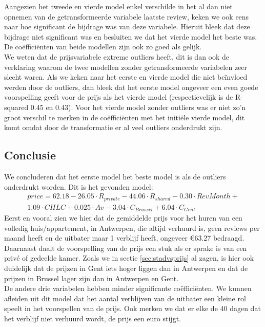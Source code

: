 \documentclass[a4paper,kulak]{kulakarticle} %
\begin{document}
Aangezien het tweede en vierde model enkel verschilde in het al dan niet opnemen van de getransformeerde variabele laatste review, keken we ook eens naar hoe significant de bijdrage was van deze variabele. Hieruit bleek dat deze bijdrage niet significant was en besluiten we dat het vierde model het beste was. De co\"effici\"enten van beide modellen zijn ook zo goed als gelijk.\\

We weten dat de prijsvariabele extreme outliers heeft, dit is dan ook de verklaring waarom de twee modellen zonder getransformeerde variabelen zeer slecht waren. Als we keken naar het eerste en vierde model die niet be\"invloed werden door de outliers, dan bleek dat het eerste model ongeveer een even goede voorspelling geeft voor de prijs als het vierde model (respectievelijk is de R-squared 0.45 en 0.43). Voor het vierde model zonder outliers was er niet zo'n groot verschil te merken in de co\"effici\"enten met het initi\"ele vierde model, dit komt omdat door de transformatie er al veel outliers onderdrukt zijn.\\
\subsection{Conclusie}
We concluderen dat het eerste model het beste model is als de outliers onderdrukt worden. Dit is het gevonden model:
\begin{multline}
price = 62.18 - 26.05\cdot R_{private}  - 44.06\cdot R_{shared}  - 0.30\cdot RevMonth + \\1.09\cdot CHLC + 0.025 \cdot Av - 3.04\cdot C_{Brussel} + 6.04\cdot C_{Gent}
\end{multline}
Eerst en vooral zien we hier dat de gemiddelde prijs voor het huren van een volledig huis/appartement, in Antwerpen, die altijd verhuurd is, geen reviews per maand heeft en de uitbater maar 1 verblijf heeft, ongeveer \euro  63.27 bedraagd. Daarnaast daalt de voorspelling van de prijs een stuk als er sprake is van een priv\'e of gedeelde kamer. Zoals we in sectie \ref{sec:stadvsprijs} al zagen, is hier ook duidelijk dat de prijzen in Gent iets hoger liggen dan in Antwerpen en dat de prijzen in Brussel lager zijn dan in Antwerpen en Gent.\\

De andere drie variabelen hebben minder significante co\"effici\"enten. We kunnen afleiden uit dit model dat het aantal verblijven van de uitbater een kleine rol speelt in het voorspellen van de prijs. Ook merken we dat er elke de 40 dagen dat het verblijf niet verhuurd wordt, de prijs een euro stijgt. 
\end{document}

